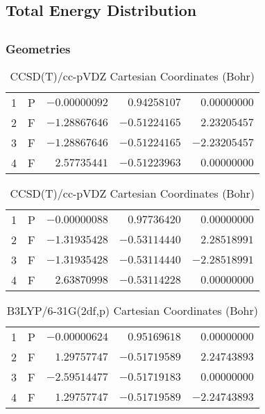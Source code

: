 \documentclass[10pt,oneside]{article}
\begin{document}
\begin{table}
\subsection*{Total Energy Distribution}
\centering\end{table}

\clearpage

\subsection{}

\begin{table}[h!]
\subsubsection*{Geometries}
\begin{multicols}{2}
\centering
\caption{CCSD(T)/cc-pVTZ Cartesian Coordinates (Bohr)}
\begin{tabular}{llrrr}
\toprule
1  & P  & $-0.00000092$ & $ 0.94258107$ & $ 0.00000000$ \\
2  & F  & $-1.28867646$ & $-0.51224165$ & $ 2.23205457$ \\
3  & F  & $-1.28867646$ & $-0.51224165$ & $-2.23205457$ \\
4  & F  & $ 2.57735441$ & $-0.51223963$ & $ 0.00000000$ \\
\bottomrule
\end{tabular}
\caption{CCSD(T)/cc-pVDZ Cartesian Coordinates (Bohr)}
\begin{tabular}{llrrr}
\toprule
1  & P  & $-0.00000088$ & $ 0.97736420$ & $ 0.00000000$ \\
2  & F  & $-1.31935428$ & $-0.53114440$ & $ 2.28518991$ \\
3  & F  & $-1.31935428$ & $-0.53114440$ & $-2.28518991$ \\
4  & F  & $ 2.63870998$ & $-0.53114228$ & $ 0.00000000$ \\
\bottomrule
\end{tabular}
\end{multicols}
\end{table}

\begin{table}[h]
\centering
\caption{B3LYP/6-31G(2df,p) Cartesian Coordinates (Bohr)}
\begin{tabular}{llrrr}
\toprule
1  & P  & $-0.00000624$ & $ 0.95169618$ & $ 0.00000000$ \\
2  & F  & $ 1.29757747$ & $-0.51719589$ & $ 2.24743893$ \\
3  & F  & $-2.59514477$ & $-0.51719183$ & $ 0.00000000$ \\
4  & F  & $ 1.29757747$ & $-0.51719589$ & $-2.24743893$ \\
\bottomrule
\end{tabular}
\end{table}
\end{document}
